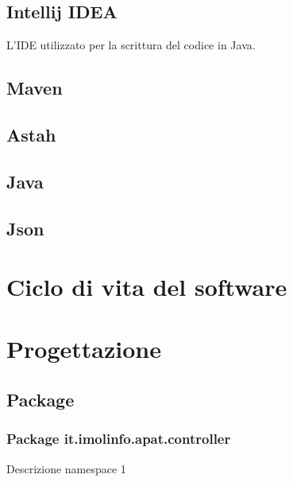 \subsection*{Intellij IDEA}
L'IDE utilizzato per la scrittura del codice in Java.

\subsection*{Maven}
\subsection*{Astah}

\subsection*{Java}
\subsection*{Json}


\section{Ciclo di vita del software}
\label{sec:ciclo-vita-software}

\section{Progettazione}
\label{sec:progettazione}

\subsection{Package}\label{subsec:package}
\begin{namespacedesc}
\end{namespacedesc}

\subsubsection{Package  it.imolinfo.apat.controller} %
Descrizione namespace 1
\begin{namespacedesc}
\end{namespacedesc}

